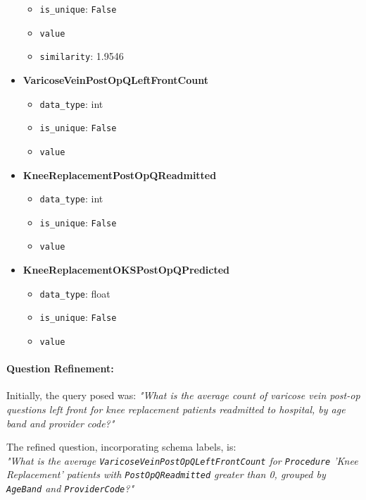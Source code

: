 \begin{itemize}
\begin{itemize}
            \item \texttt{is\_unique}: \texttt{False}
            \item \texttt{value}
            \item \texttt{similarity}: 1.9546
        \end{itemize}
    \item \textbf{VaricoseVeinPostOpQLeftFrontCount}  
        \begin{itemize}
            \item \texttt{data\_type}: int
            \item \texttt{is\_unique}: \texttt{False}
            \item \texttt{value}
        \end{itemize}
    \item \textbf{KneeReplacementPostOpQReadmitted}  
        \begin{itemize}
            \item \texttt{data\_type}: int
            \item \texttt{is\_unique}: \texttt{False}
            \item \texttt{value}
        \end{itemize}
    \item \textbf{KneeReplacementOKSPostOpQPredicted}  
        \begin{itemize}
            \item \texttt{data\_type}: float
            \item \texttt{is\_unique}: \texttt{False}
            \item \texttt{value}
        \end{itemize}
\end{itemize}
\linebreak 
\paragraph{Question Refinement:} \linebreak
\linebreak 
\linebreak  
Initially, the query posed was: 
\textit{"What is the average count of varicose vein post-op questions left front for knee replacement patients readmitted to hospital, by age band and provider code?"}  

The refined question, incorporating schema labels, is: \\ 
\textit{"What is the average \texttt{VaricoseVeinPostOpQLeftFrontCount} for \texttt{Procedure} 'Knee Replacement' patients with \texttt{PostOpQReadmitted} greater than 0, grouped by \texttt{AgeBand} and \texttt{ProviderCode}?"}  

